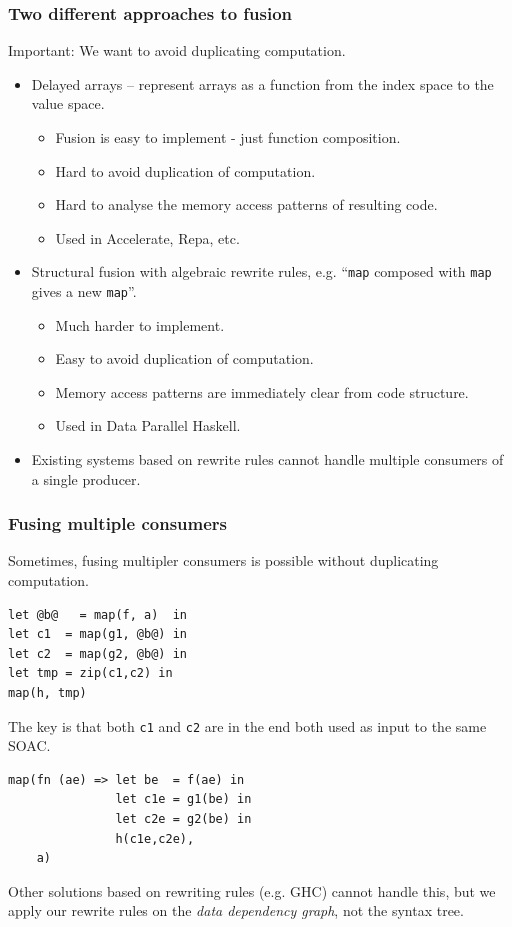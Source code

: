 \documentclass[rgb,dvipsnames]{beamer}
\begin{document}
\begin{frame}
  \frametitle{Two different approaches to fusion}

  Important: We want to avoid duplicating computation.

  \begin{itemize}
  \item Delayed arrays -- represent arrays as a function from the index
    space to the value space.
    \begin{itemize}
    \item Fusion is easy to implement - just function composition.
    \item Hard to avoid duplication of computation.
    \item Hard to analyse the memory access patterns of resulting code.
    \item Used in Accelerate, Repa, etc.
    \end{itemize}
    \pause
  \item Structural fusion with algebraic rewrite rules,
    e.g. ``\texttt{map} composed with \texttt{map} gives a new
    \texttt{map}''.
    \begin{itemize}
    \item Much harder to implement.
    \item Easy to avoid duplication of computation.
    \item Memory access patterns are immediately clear from code
      structure.
    \item Used in Data Parallel Haskell.
    \end{itemize}
  \item Existing systems based on rewrite rules cannot handle multiple
    consumers of a single producer.
  \end{itemize}
\end{frame}

\begin{frame}[fragile]
  \frametitle{Fusing multiple consumers}

  Sometimes, fusing multipler consumers is possible without
  duplicating computation.

\begin{lstlisting}
let @b@   = map(f, a)  in
let c1  = map(g1, @b@) in
let c2  = map(g2, @b@) in
let tmp = zip(c1,c2) in
map(h, tmp)
\end{lstlisting}

  The key is that both \texttt{c1} and \texttt{c2} are in the end both
  used as input to the same SOAC.

\begin{lstlisting}
map(fn (ae) => let be  = f(ae) in
               let c1e = g1(be) in
               let c2e = g2(be) in
               h(c1e,c2e),
    a)
\end{lstlisting}

  Other solutions based on rewriting rules (e.g. GHC) cannot handle
  this, but we apply our rewrite rules on the \textit{data dependency
    graph}, not the syntax tree.
\end{frame}
\end{document}
